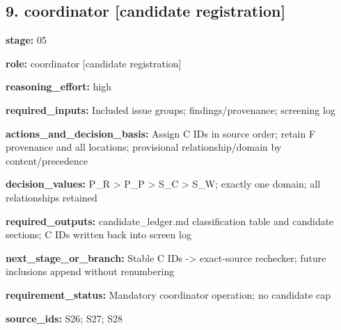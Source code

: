 \documentclass[10pt,a4paper]{article}
\begin{document}
\subsection*{9.\allowbreak{} coordinator [candidate registration]}
\textbf{stage:} 05\par
\textbf{role:} coordinator [candidate registration]\par
\textbf{reasoning\_\allowbreak{}effort:} high\par
\textbf{required\_\allowbreak{}inputs:} Included issue groups; findings/\allowbreak{}provenance; screening log\par
\textbf{actions\_\allowbreak{}and\_\allowbreak{}decision\_\allowbreak{}basis:} Assign C IDs in source order; retain F provenance and all locations; provisional relationship/\allowbreak{}domain by content/\allowbreak{}precedence\par
\textbf{decision\_\allowbreak{}values:} P\_\allowbreak{}R > P\_\allowbreak{}P > S\_\allowbreak{}C > S\_\allowbreak{}W; exactly one domain; all relationships retained\par
\textbf{required\_\allowbreak{}outputs:} candidate\_\allowbreak{}ledger.\allowbreak{}md classification table and candidate sections; C IDs written back into screen log\par
\textbf{next\_\allowbreak{}stage\_\allowbreak{}or\_\allowbreak{}branch:} Stable C IDs -\allowbreak{}> exact-\allowbreak{}source rechecker; future inclusions append without renumbering\par
\textbf{requirement\_\allowbreak{}status:} Mandatory coordinator operation; no candidate cap\par
\textbf{source\_\allowbreak{}ids:} S26; S27; S28\par
\end{document}
